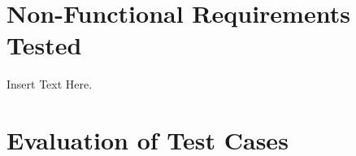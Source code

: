 \documentclass[12pt]{article}
\begin{document}
\section{Non-Functional Requirements Tested}
Insert Text Here.

\section{Evaluation of Test Cases}
\end{document}
